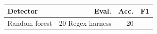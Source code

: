 \begin{tabular}{lrrr}
\toprule
Detector & Eval. & Acc. & F1 \\
\midrule
Random forest & 20%
Regex harness & 20%
\bottomrule
\end{tabular}
